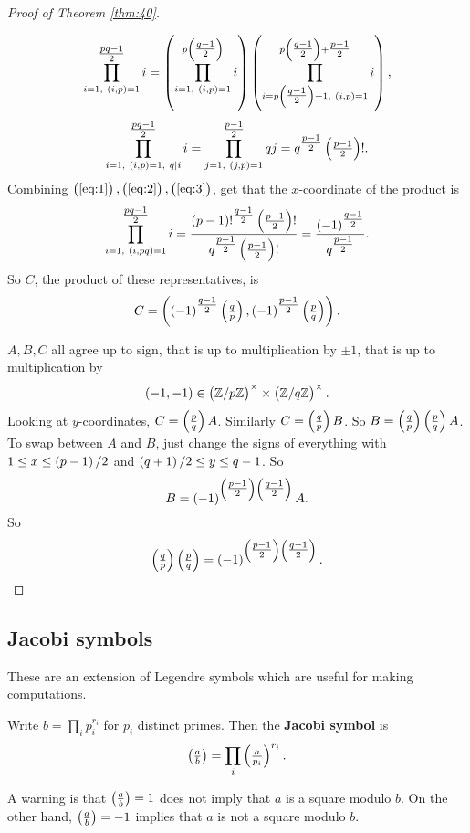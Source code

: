 \begin{proof}[Proof of Theorem \ref{thm:40}]
\begin{itemize}
\begin{equation}
\label{eq:2}
\prod_{i = 1, \ \br{i, p} = 1}^{\tfrac{pq - 1}{2}} i = \br{\prod_{i = 1, \ \br{i, p} = 1}^{p\br{\tfrac{q - 1}{2}}} i}\br{\prod_{i = p\br{\tfrac{q - 1}{2}} + 1, \ \br{i, p} = 1}^{p\br{\tfrac{q - 1}{2}} + \tfrac{p - 1}{2}} i},
\end{equation}
\begin{equation}
\label{eq:3}
\prod_{i = 1, \ \br{i, p} = 1, \ q \mid i}^{\tfrac{pq - 1}{2}} i = \prod_{j = 1, \ \br{j, p} = 1}^{\tfrac{p - 1}{2}} qj = q^{\tfrac{p - 1}{2}}\br{\tfrac{p - 1}{2}}!.
\end{equation}
Combining $ \br{\ref{eq:1}}, \br{\ref{eq:2}}, \br{\ref{eq:3}} $, get that the $ x $-coordinate of the product is
$$ \prod_{i = 1, \ \br{i, pq} = 1}^{\tfrac{pq - 1}{2}} i = \dfrac{\br{p - 1}!^{\tfrac{q - 1}{2}}\br{\tfrac{p - 1}{2}}!}{q^{\tfrac{p - 1}{2}}\br{\tfrac{p - 1}{2}}!} = \dfrac{\br{-1}^{\tfrac{q - 1}{2}}}{q^{\tfrac{p - 1}{2}}}. $$
So $ C $, the product of these representatives, is
$$ C = \br{\br{-1}^{\tfrac{q - 1}{2}}\jacobi{q}{p}, \br{-1}^{\tfrac{p - 1}{2}}\jacobi{p}{q}}. $$
\end{itemize}

\pagebreak

$ A, B, C $ all agree up to sign, that is up to multiplication by $ \pm 1 $, that is up to multiplication by
$$ \br{-1, -1} \in \unit{p} \times \unit{q}. $$
Looking at $ y $-coordinates, $ C = \jacobi{p}{q}A $. Similarly $ C = \jacobi{q}{p}B $. So $ B = \jacobi{q}{p}\jacobi{p}{q}A $. To swap between $ A $ and $ B $, just change the signs of everything with $ 1 \le x \le \br{p - 1} / 2 $ and $ \br{q + 1} / 2 \le y \le q - 1 $. So
$$ B = \br{-1}^{\br{\tfrac{p - 1}{2}}\br{\tfrac{q - 1}{2}}}A. $$
So
$$ \jacobi{q}{p}\jacobi{p}{q} = \br{-1}^{\br{\tfrac{p - 1}{2}}\br{\tfrac{q - 1}{2}}}. $$
\end{proof}

\subsection{Jacobi symbols}

These are an extension of Legendre symbols which are useful for making computations.

\begin{definition}
Write $ b = \prod_i p_i^{r_i} $ for $ p_i $ distinct primes. Then the \textbf{Jacobi symbol} is
$$ \jacobi{a}{b} = \prod_i \jacobi{a}{p_i}^{r_i}. $$
\end{definition}

A warning is that $ \jacobi{a}{b} = 1 $ does not imply that $ a $ is a square modulo $ b $. On the other hand, $ \jacobi{a}{b} = -1 $ implies that $ a $ is not a square modulo $ b $.

